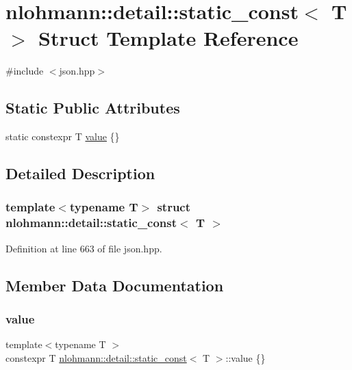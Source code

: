 \hypertarget{structnlohmann_1_1detail_1_1static__const}{}\section{nlohmann\+::detail\+::static\+\_\+const$<$ T $>$ Struct Template Reference}
\label{structnlohmann_1_1detail_1_1static__const}


{\ttfamily \#include $<$json.\+hpp$>$}

\subsection*{Static Public Attributes}
\begin{DoxyCompactItemize}
\item 
static constexpr T \mbox{\hyperlink{structnlohmann_1_1detail_1_1static__const_a6bb7ab2ddd6abc41fb4ffb7c6dfa237e}{value}} \{\}
\end{DoxyCompactItemize}


\subsection{Detailed Description}
\subsubsection*{template$<$typename T$>$\newline
struct nlohmann\+::detail\+::static\+\_\+const$<$ T $>$}



Definition at line 663 of file json.\+hpp.



\subsection{Member Data Documentation}
\mbox{\label{structnlohmann_1_1detail_1_1static__const_a6bb7ab2ddd6abc41fb4ffb7c6dfa237e}} 
\subsubsection{\texorpdfstring{value}{value}}
{\footnotesize\ttfamily template$<$typename T $>$ \\
constexpr T \mbox{\hyperlink{structnlohmann_1_1detail_1_1static__const}{nlohmann\+::detail\+::static\+\_\+const}}$<$ T $>$\+::value \{\}\hspace{0.3cm}{\ttfamily [static]}}



